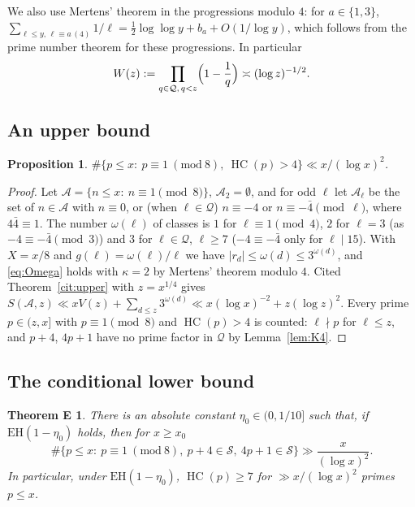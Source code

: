\documentclass[11pt,reqno]{amsart}
\newtheorem{proposition}[theorem]{Proposition}
\newtheorem*{thmE}{Theorem E}
\theoremstyle{definition}
\newcommand{\cS}{\mathcal S}
\newcommand{\cQ}{\mathcal Q}
\newcommand{\cA}{\mathcal A}
\newcommand{\HC}{\operatorname{HC}}
\newcommand{\EH}{\mathrm{EH}}
\begin{document}
We also use Mertens' theorem in the progressions modulo $4$: for
$a\in\{1,3\}$,
$\sum_{\ell\le y,\,\ell\equiv a\,(4)}1/\ell=\tfrac12\log\log y+b_a+O(1/\log y)$,
which follows from the prime number theorem for these progressions.  In
particular
\begin{equation}\label{eq:W}
W(z):=\prod_{q\in\cQ,\,q<z}\Bigl(1-\frac1q\Bigr)\asymp(\log z)^{-1/2}.
\end{equation}

\subsection{An upper bound}

\begin{proposition}\label{prop:upper4}
$\#\{p\le x:\ p\equiv1\ (\mathrm{mod}\ 8),\ \HC(p)>4\}\ll x/(\log x)^2$.
\end{proposition}

\begin{proof}
Let $\cA=\{n\le x:\ n\equiv1\pmod8\}$, $\cA_2=\emptyset$, and for odd
$\ell$ let $\cA_\ell$ be the set of $n\in\cA$ with $n\equiv0$, or (when
$\ell\in\cQ$) $n\equiv-4$ or $n\equiv-\bar4\pmod\ell$, where $4\bar4\equiv1$.
The number $\omega(\ell)$ of classes is $1$ for $\ell\equiv1\pmod4$, $2$ for
$\ell=3$ (as $-4\equiv-\bar4\pmod3$) and $3$ for $\ell\in\cQ$, $\ell\ge7$
($-4\equiv-\bar4$ only for $\ell\mid15$).  With $X=x/8$ and
$g(\ell)=\omega(\ell)/\ell$ we have $|r_d|\le\omega(d)\le3^{\omega(d)}$, and
\eqref{eq:Omega} holds with $\kappa=2$ by Mertens' theorem modulo $4$.
Cited Theorem~\ref{cit:upper} with $z=x^{1/4}$ gives
$S(\cA,z)\ll xV(z)+\sum_{d\le z}3^{\omega(d)}\ll x(\log x)^{-2}+z(\log z)^2$.
Every prime $p\in(z,x]$ with $p\equiv1\pmod8$ and $\HC(p)>4$ is counted:
$\ell\nmid p$ for $\ell\le z$, and $p+4$, $4p+1$ have no prime factor in
$\cQ$ by Lemma~\ref{lem:K4}.
\end{proof}

\subsection{The conditional lower bound}

\begin{thmE}
There is an absolute constant $\eta_0\in(0,1/10]$ such that, if
$\EH(1-\eta_0)$ holds, then for $x\ge x_0$
\[
\#\{p\le x:\ p\equiv1\ (\mathrm{mod}\ 8),\ p+4\in\cS,\ 4p+1\in\cS\}\gg\frac x{(\log x)^2}.
\]
In particular, under $\EH(1-\eta_0)$, $\HC(p)\ge7$ for $\gg x/(\log x)^2$
primes $p\le x$.
\end{thmE}
\end{document}
